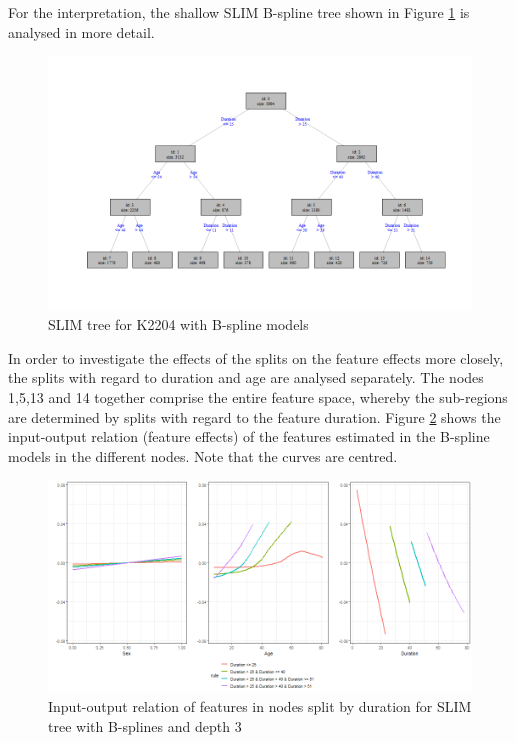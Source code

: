 For the interpretation, the shallow SLIM B-spline tree shown in Figure \ref{fig:ins_slim_bsplines_tree} is analysed in more detail.

\begin{figure}[!htb]
    \centering   
    \includegraphics[width = 16cm]{Figures/insurance_use_case/k2204_BPV/slim_bsplines_small_tree.png}
    \caption{SLIM tree for K2204 with B-spline models}
    \label{fig:ins_slim_bsplines_tree}
\end{figure}

In order to investigate the effects of the splits on the feature effects more closely, the splits with regard to duration and age are analysed separately.
The nodes 1,5,13 and 14 together comprise the entire feature space, whereby the sub-regions are determined by splits with regard to the feature duration.
Figure \ref{fig:ins_k2204_effects_duration} shows the input-output relation (feature effects) of the features estimated in the B-spline models in the different nodes. Note that the curves are centred.

\begin{figure}[!htb]
    \centering
    \includegraphics[width = 16cm]{Figures/insurance_use_case/k2204_BPV/effects_duration.png}
    \caption{Input-output relation of features in nodes split by duration for SLIM tree with B-splines and depth 3}
    \label{fig:ins_k2204_effects_duration}
\end{figure}

